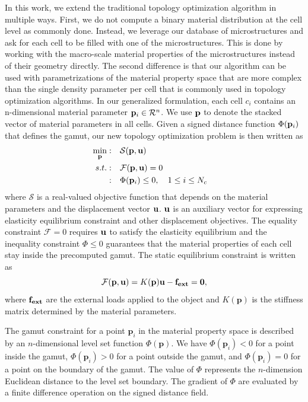 In this work, we extend the traditional topology optimization algorithm in multiple ways.
First, we do not compute a binary material distribution at the cell level as commonly done.
Instead, we leverage our database of microstructures and ask for each cell to be filled with one of the microstructures.
This is done by working with the macro-scale material properties of the microstructures instead of their geometry directly.
The second difference is that our algorithm can be used with parametrizations of the material property space that are more complex than the single density parameter per cell that is commonly used in topology optimization algorithms.
In our generalized formulation, each cell $c_i$ contains an n-dimensional material parameter $\mathbf{p}_i\in \mathcal{R}^n$.
We use $\mathbf{p}$ to denote the stacked vector of material parameters in all cells.
Given a signed distance function $\Phi(\mathbf{p}_i)$ that defines the gamut,
our new topology optimization problem is then written as
\begin{equation}
\begin{aligned}
\min_{\mathbf{p}} : \quad & \mathcal{S}(\mathbf{p},\mathbf{u}) & \\
s.t. : \quad & \mathcal{F}(\mathbf{\mathbf{p}},\mathbf{u})=0 & \\
: \quad & \Phi(\mathbf{p}_i)\leq 0,  \quad 1\leq i \leq N_c&	
\label{eq:op}
\end{aligned}
\end{equation}
where $\mathcal{S}$ is a real-valued objective function that depends on the material parameters and the displacement vector $\mathbf{u}$.
$\mathbf{u}$ is an auxiliary vector for expressing elasticity equilibrium constraint and other displacement objectives.
The equality constraint $\mathcal{F}=0$ requires $\mathbf{u}$ to satisfy the elasticity equilibrium and the inequality constraint $\Phi\leq0$ guarantees that the material properties of each cell stay inside the precomputed gamut.
The static equilibrium constraint is written as 
\begin{equation}
\mathcal{F}(\mathbf{p},\mathbf{u})=K(\mathbf{p})\mathbf{u}-\bf f_{ext}=0,
\end{equation}
where $\bf f_{ext}$ are the external loads applied to the object and
$K(\mathbf{p})$ is the stiffness matrix determined by the material parameters.

The gamut constraint for a point $\mathbf{p}_i$ in the material property space is described by an $n$-dimensional level set function $\Phi(\mathbf{p})$.
We have $\Phi(\mathbf{p}_i)<0$ for a point inside the gamut, $\Phi(\mathbf{p}_i)>0$ for a point outside the gamut, and $\Phi(\mathbf{p}_i)=0$ for a point on the boundary of the gamut.
The value of $\Phi$ represents the $n$-dimension Euclidean distance to the level set boundary.
The gradient of $\Phi$ are evaluated by a finite difference operation on the signed distance field.

